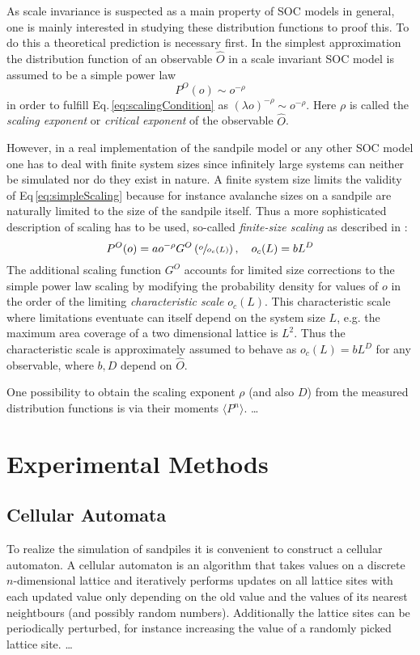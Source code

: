 As scale invariance is suspected as a main property of SOC models in general, one is mainly interested in studying
these distribution functions to proof this. To do this a theoretical prediction is necessary first.
In the simplest approximation the distribution function of an observable $\hat{O}$ in a scale invariant SOC model
is assumed to be a simple power law
\begin{equation}\label{eq:simpleScaling}
P^{O}(o) \sim o^{-\rho}
\end{equation}
in order to fulfill Eq.\,\eqref{eq:scalingCondition} as $(\lambda o)^{-\rho}\sim o^{-\rho}$.
Here $\rho$ is called the \emph{scaling exponent} or \emph{critical exponent} of the observable $\hat{O}$.

However, in a real implementation of the sandpile model or any other SOC model one has to deal with finite system sizes
since infinitely large systems can neither be simulated nor do they exist in nature.
A finite system size limits the validity of Eq\,\eqref{eq:simpleScaling} because for instance avalanche sizes on a
sandpile are naturally limited to the size of the sandpile itself. Thus a more sophisticated description of scaling
has to be used, so-called \emph{finite-size scaling} as described in \cite{SOC-book}:
\begin{equation}\label{eq:finiteSizeScaling}
P^{O}(o) = a o^{-\rho} G^{O}\left(\sfrac{o}{o_c(L)}\right), \quad o_c(L)=b L^D
\end{equation}
The additional scaling function $G^{O}$ accounts for limited size corrections to the simple power law scaling
by modifying the probability density for values of $o$ in the order of the limiting \emph{characteristic scale}
$o_c(L)$. This characteristic scale where limitations eventuate can itself depend on the system size $L$,
e.g. the maximum area coverage of a two dimensional lattice is $L^2$. Thus the characteristic scale is approximately
assumed to behave as $o_c(L)=b L^D$ for any observable, where $b,D$ depend on $\hat{O}$.

One possibility to obtain the scaling exponent $\rho$ (and also $D$) from the measured distribution functions
is via their moments $\langle P^n\rangle$.
\dots%


\section{Experimental Methods}
\label{sec:experiment}

\subsection{Cellular Automata}
\label{sec:cellularAutomata}
To realize the simulation of sandpiles it is convenient to construct a cellular automaton.
A cellular automaton is an algorithm that takes values on a discrete $n$-dimensional lattice and iteratively
performs updates on all lattice sites with each updated value only depending on the old value and the values of its
nearest neightbours (and possibly random numbers). Additionally the lattice sites can be periodically perturbed,
for instance increasing the value of a randomly picked lattice site.
\dots%

